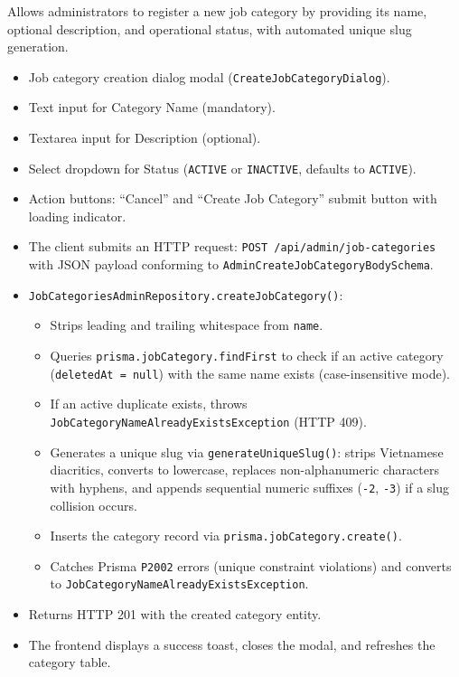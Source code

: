 \noindent Allows administrators to register a new job category by providing its name, optional description, and operational status, with automated unique slug generation.

\begin{itemize}[leftmargin=1.6em,topsep=3pt,itemsep=2pt,parsep=0pt,label=$\bullet$]
    \item Job category creation dialog modal (\texttt{CreateJobCategoryDialog}).
    \item Text input for Category Name (mandatory).
    \item Textarea input for Description (optional).
    \item Select dropdown for Status (\texttt{ACTIVE} or \texttt{INACTIVE}, defaults to \texttt{ACTIVE}).
    \item Action buttons: ``Cancel'' and ``Create Job Category'' submit button with loading indicator.
\end{itemize}

\begin{itemize}[leftmargin=1.6em,topsep=3pt,itemsep=2pt,parsep=0pt,label=$\bullet$]
    \item The client submits an HTTP request: \texttt{POST /api/admin/job-categories} with JSON payload conforming to \texttt{AdminCreateJobCategoryBodySchema}.
    \item \texttt{JobCategoriesAdminRepository.createJobCategory()}:
        \begin{itemize}[leftmargin=1.6em,topsep=2pt,itemsep=2pt,parsep=0pt]
            \item Strips leading and trailing whitespace from \texttt{name}.
            \item Queries \texttt{prisma.jobCategory.findFirst} to check if an active category (\texttt{deletedAt = null}) with the same name exists (case-insensitive mode).
            \item If an active duplicate exists, throws \texttt{JobCategory\-Name\-Already\-Exists\-Exception} (HTTP 409).
            \item Generates a unique slug via \texttt{generateUniqueSlug()}: strips Vietnamese diacritics, converts to lowercase, replaces non-alphanumeric characters with hyphens, and appends sequential numeric suffixes (\texttt{-2}, \texttt{-3}) if a slug collision occurs.
            \item Inserts the category record via \texttt{prisma.jobCategory.create()}.
            \item Catches Prisma \texttt{P2002} errors (unique constraint violations) and converts to \texttt{JobCategory\-Name\-Already\-Exists\-Exception}.
        \end{itemize}
    \item Returns HTTP 201 with the created category entity.
    \item The frontend displays a success toast, closes the modal, and refreshes the category table.
\end{itemize}

